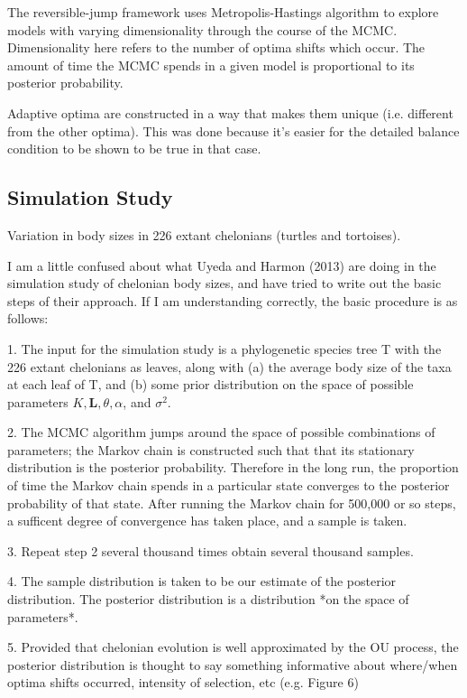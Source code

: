 \documentclass{article}
\begin{document}
The reversible-jump framework uses Metropolis-Hastings algorithm to explore
models with varying dimensionality through the course of the MCMC.
Dimensionality here refers to the number of optima shifts which occur. The
amount of time the MCMC spends in a given model is proportional to its posterior
probability.

Adaptive optima are constructed in a way that makes them unique (i.e. different
from the other optima). This was done because it's easier for the detailed
balance condition to be shown to be true in that case.


\subsection{Simulation Study}
Variation in body sizes in 226 extant chelonians (turtles and tortoises).

I am a little confused about what Uyeda and Harmon (2013) are doing in the
simulation study of chelonian body sizes, and have tried to write out the basic
steps of their approach. If I am understanding correctly, the basic procedure is
as follows:

1. The input for the simulation study is a phylogenetic species tree T with
the 226 extant chelonians as leaves, along with (a) the average body size of the
taxa at each leaf of T, and (b) some prior distribution on the space of
possible parameters $K, \mathbf{L}, \theta, \alpha$, and $\sigma^{2}$.

2. The MCMC algorithm jumps around the space of possible combinations of
parameters; the Markov chain is constructed such that that its stationary
distribution is the posterior probability. Therefore in the long run, the
proportion of time the Markov chain spends in a particular state converges to
the posterior probability of that state. After running the Markov chain for
500,000 or so steps, a sufficent degree of convergence has taken place, and a
sample is taken.

3. Repeat step 2 several thousand times obtain several thousand samples.

4. The sample distribution is taken to be our estimate of the posterior
distribution. The posterior distribution is a distribution *on the space of
parameters*.

5. Provided that chelonian evolution is well approximated by the OU process, the
posterior distribution is thought to say something informative about where/when
optima shifts occurred, intensity of selection, etc (e.g. Figure 6)
\end{document}

